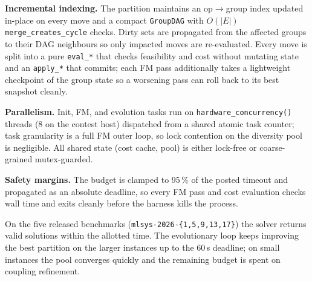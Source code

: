 \documentclass[10pt,a4paper]{article}
\makeatletter
\renewcommand\section{\@startsection{section}{1}{\z@}{6pt}{2pt}{\normalsize\bfseries}}
\makeatother
\begin{document}
\textbf{Incremental indexing.} The partition maintains an op$\to$group
index updated in-place on every move and a compact \texttt{GroupDAG}
with $O(|E|)$ \texttt{merge\_creates\_cycle} checks. Dirty sets are
propagated from the affected groups to their DAG neighbours so only
impacted moves are re-evaluated. Every move is split into a pure
\texttt{eval\_*} that checks feasibility and cost without mutating
state and an \texttt{apply\_*} that commits; each FM pass additionally
takes a lightweight checkpoint of the group state so a worsening pass
can roll back to its best snapshot cleanly.

\textbf{Parallelism.} Init, FM, and evolution tasks run on
\texttt{hardware\_concurrency()} threads (8 on the contest host)
dispatched from a shared atomic task counter; task granularity
is a full FM outer loop, so lock contention on the diversity pool is
negligible. All shared state (cost cache, pool) is either lock-free or
coarse-grained mutex-guarded.

\textbf{Safety margins.} The budget is clamped to 95\,\% of the posted
timeout and propagated as an absolute deadline, so every FM pass and
cost evaluation checks wall time and exits cleanly before the harness
kills the process.

\section{Results}

On the five released benchmarks (\texttt{mlsys-2026-\{1,5,9,13,17\}})
the solver returns valid solutions within the allotted time. The
evolutionary loop keeps improving the best partition on the larger
instances up to the 60\,s deadline; on small instances the pool
converges quickly and the remaining budget is spent on coupling
refinement.
\end{document}
